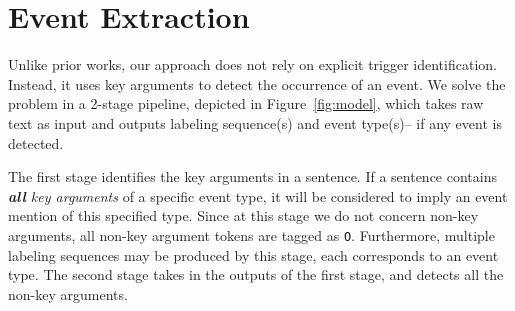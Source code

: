 \section{Event Extraction}

Unlike prior works, our approach does not rely on explicit trigger identification. Instead, it uses key arguments to detect the occurrence of
an event. We solve the problem in a 2-stage pipeline, depicted in Figure~\ref{fig:model}, which takes raw text as input and outputs  labeling sequence(s) and event type(s)-- if any event is detected.

The first stage identifies the key arguments in a sentence. If a sentence contains \emph{\textbf{all} key arguments} of a specific
event type, it will be considered to imply an event mention of this specified type.
Since at this stage we do not concern non-key arguments, all non-key argument tokens
are tagged as \texttt{O}. Furthermore, multiple labeling sequences may be produced by this stage, each corresponds to an event type. The
second stage takes in the outputs of the first stage, and detects all the non-key arguments.


%


